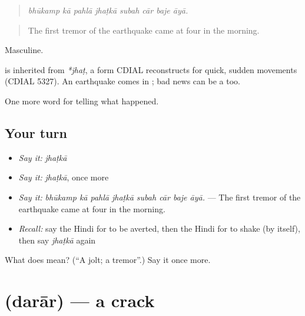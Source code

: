 \begin{quote}
       
\end{quote}

\begin{quote}
\emph{bhūkamp kā pahlā jhaṭkā subah cār baje āyā.}
\end{quote}

\begin{quote}
The first tremor of the earthquake came at four in the morning.
\end{quote}

Masculine.

\begin{cousinweb}
is inherited from \emph{*jhaṭ}, a form CDIAL reconstructs for quick, sudden movements (CDIAL 5327). An earthquake comes in \textbf{}; bad news can be a \textbf{} too.
\end{cousinweb}

\begin{grammarlens}[title={What you've built}]
One more word for telling what happened.
\end{grammarlens}

\subsection*{Your turn}
\begin{itemize}
\raggedright
  \item \emph{Say it:} \emph{jhaṭkā}
  \item \emph{Say it:} \emph{jhaṭkā}, once more
  \item \emph{Say it:} \emph{bhūkamp kā pahlā jhaṭkā subah cār baje āyā.} — The first tremor of the earthquake came at four in the morning.
  \item \emph{Recall:} say the Hindi for to be averted, then the Hindi for to shake (by itself), then say \emph{jhaṭkā} again
\end{itemize}

\begin{tcolorbox}[breakable,colback=teal!4,colframe=teal!35!black,title={Before you move on}]
What does  mean? (\textquotedblleft{}A jolt; a tremor\textquotedblright{}.) Say it once more.
\end{tcolorbox}
\section[\texorpdfstring{\hi{दरार} (darār)}{दरार (darār)}]{ (darār) — a crack}

